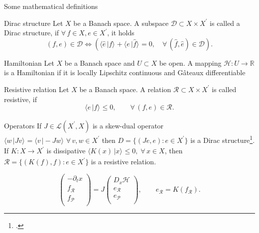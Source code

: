 \documentclass[aspectratio=169]{beamer}
\newcommand{\bbR}{\mathbb{R}}
\newcommand{\dualpr}[3][]{\ensuremath{\langle #2 \, \vert #3 \rangle_{#1}}}
\begin{document}
\begin{frame}{Some mathematical definitions}
	\begin{block}{Dirac structure}
			Let $X$ be a Banach space. A subspace $\mathcal{D}\subset X \times X^{'}$ is called a Dirac structure, if $\forall \, f \in X, e \in X^{'}$, it holds
			\begin{equation*}
				(f, e) \in \mathcal{D} \iff \left( \dualpr{\widehat{e}}{f} + \dualpr{e}{\widehat{f}}=0, \quad \forall\, (\widehat{f}, \widehat{e}) \in \mathcal{D}\right).
			\end{equation*}
		\end{block}

		\begin{block}{Hamiltonian}
			Let $X$ be a Banach space and $U \subset X$ be open. A mapping $\mathcal{H} : U \rightarrow \bbR$ is a Hamiltonian if it is locally Lipschitz continuous and G\^{a}teaux differentiable
		\end{block}
		
		\begin{block}{Resistive relation}
			Let $X$ be a Banach space.
			A relation $\mathcal{R} \subset X \times X^{'}$ is called resistive, if
			\begin{equation*}
				\dualpr{e}{f} \le 0, \qquad \forall\, (f,e) \in \mathcal{R}.
			\end{equation*}
		
		\end{block}

\end{frame}

\begin{frame}{Operators}
	If $J \in \mathcal{L}(X^{'}, X)$ is a skew-dual operator $\dualpr{w}{J v}= \dualpr{v}{-Jw}\; \forall\, v, w \in X^{'}$ then $D = \{(J e, e) : e \in X^{'}\}$ is a Dirac structure\footcite{reis2022passivity}.\\
	\vspace{.2cm}
	If $K :X \rightarrow X^{'}$ is dissipative $\dualpr{K(x)}{x} \le 0,\; \forall \, x \in X$, then $\mathcal{R} = \{(K(f), f) : e \in X^{'}\}$ is a resistive relation.
	
	\begin{equation*}
		\begin{pmatrix}
			-\partial_t x \\
			f_\mathcal{R} \\
			f_\mathcal{P} \\
		\end{pmatrix} =
		J
		\begin{pmatrix}
			D_x\mathcal{H} \\
			e_\mathcal{R} \\
			e_\mathcal{P} \\
		\end{pmatrix}, \qquad e_{\mathcal{R}} = K(f_{\mathcal{R}}).
	\end{equation*}
\end{frame}
\end{document}
